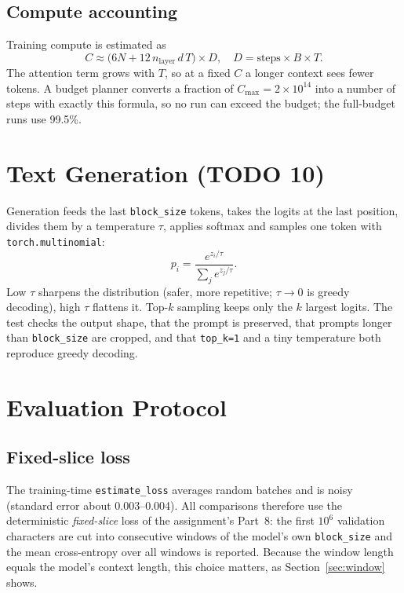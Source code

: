 \documentclass[10pt,twocolumn]{article}
\begin{document}
\subsection{Compute accounting}
Training compute is estimated as \cite{kaplan2020}
\begin{equation}
C\approx\big(6N+12\,n_{\text{layer}}\,d\,T\big)\times D,\quad D=\text{steps}\times B\times T.
\end{equation}
The attention term grows with $T$, so at a fixed $C$ a longer context sees fewer tokens. A budget planner converts a fraction of $C_{\max}=2\times10^{14}$ into a number of steps with exactly this formula, so no run can exceed the budget; the full-budget runs use 99.5\%.

\section{Text Generation (TODO 10)}\label{sec:gen}
Generation feeds the last \texttt{block\_size} tokens, takes the logits at the last position, divides them by a temperature $\tau$, applies softmax and samples one token with \texttt{torch.multinomial}:
\begin{equation}
p_i=\frac{e^{z_i/\tau}}{\sum_je^{z_j/\tau}}.
\end{equation}
Low $\tau$ sharpens the distribution (safer, more repetitive; $\tau\to0$ is greedy decoding), high $\tau$ flattens it. Top-$k$ sampling \cite{fan2018} keeps only the $k$ largest logits. The test checks the output shape, that the prompt is preserved, that prompts longer than \texttt{block\_size} are cropped, and that \texttt{top\_k=1} and a tiny temperature both reproduce greedy decoding.

\section{Evaluation Protocol}\label{sec:eval}
\subsection{Fixed-slice loss}
The training-time \texttt{estimate\_loss} averages random batches and is noisy (standard error about 0.003--0.004). All comparisons therefore use the deterministic \emph{fixed-slice} loss of the assignment's Part~8: the first $10^6$ validation characters are cut into consecutive windows of the model's own \texttt{block\_size} and the mean cross-entropy over all windows is reported. Because the window length equals the model's context length, this choice matters, as Section~\ref{sec:window} shows.
\end{document}
